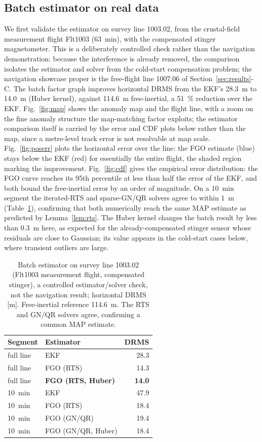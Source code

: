 \documentclass{IEEEtaes}
\begin{document}
\subsection{Batch estimator on real data}
We first validate the estimator on survey line 1003.02, from the
crustal-field measurement flight Flt1003 (\SI{63}{\minute}), with the compensated
stinger magnetometer. This is a deliberately controlled check rather than the
navigation demonstration: because the interference is already removed, the
comparison isolates the estimator and solver from the cold-start compensation
problem; the navigation showcase proper is the free-flight line 1007.06 of
Section~\ref{sec:results}-C. The batch factor graph improves horizontal DRMS
from the EKF's \SI{28.3}{\meter} to \SI{14.0}{\meter} (Huber kernel), against
\SI{114.6}{\meter} free-inertial, a \SI{51}{\percent} reduction over the EKF.
Fig.~\ref{fig:map} shows the anomaly map and the flight line, with a zoom on the
fine anomaly structure the map-matching factor exploits; the estimator comparison
itself is carried by the error and CDF plots below rather than the map, since a
metre-level track error is not resolvable at map scale.
Fig.~\ref{fig:poserr} plots the horizontal error over the line:
the FGO estimate (blue) stays below the EKF (red) for essentially the entire flight,
the shaded region marking the improvement. Fig.~\ref{fig:cdf} gives the empirical
error distribution: the FGO curve reaches its 95th percentile at less than
half the error of the EKF, and both bound the free-inertial error by an order of
magnitude. On a \SI{10}{\minute} segment the iterated-RTS and sparse-GN/QR solvers
agree to within \SI{1}{\meter} (Table~\ref{tab:bench}), confirming that both
numerically reach the same MAP estimate as predicted by Lemma~\ref{lem:rts}. The
Huber kernel changes the batch result by less than \SI{0.3}{\meter} here, as
expected for the already-compensated stinger sensor whose residuals are close to
Gaussian; its value appears in the cold-start cases below, where transient outliers
are large.

\begin{table}[t]
\caption{Batch estimator on survey line 1003.02 (Flt1003 measurement flight,
compensated stinger), a controlled estimator/solver check, not the navigation
result; horizontal DRMS [m]. Free-inertial reference \SI{114.6}{\meter}. The RTS
and GN/QR solvers agree, confirming a common MAP estimate.}
\label{tab:bench}
\centering
\begin{tabular}{llr}
\toprule
Segment & Estimator & DRMS \\
\midrule
full line & EKF & 28.3 \\
full line & FGO (RTS) & 14.3 \\
full line & \textbf{FGO (RTS, Huber)} & \textbf{14.0} \\
\midrule
\SI{10}{\minute} & EKF & 47.9 \\
\SI{10}{\minute} & FGO (RTS) & 18.4 \\
\SI{10}{\minute} & FGO (GN/QR) & 19.4 \\
\SI{10}{\minute} & FGO (GN/QR, Huber) & 18.4 \\
\bottomrule
\end{tabular}
\end{table}
\end{document}
